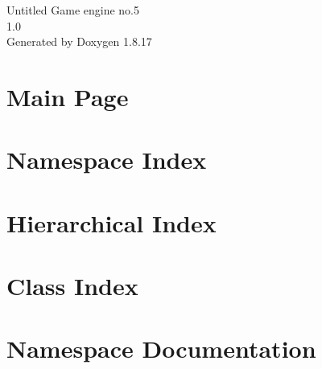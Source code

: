 \let\mypdfximage\pdfximage\def\pdfximage{\immediate\mypdfximage}\documentclass[twoside]{book}
\newcommand{\+}{\discretionary{\mbox{\scriptsize$\hookleftarrow$}}{}{}}
\newcommand{\clearemptydoublepage}{%
  \newpage{\pagestyle{empty}\cleardoublepage}%
}
\begin{document}
\hypersetup{pageanchor=false,
             bookmarksnumbered=true,
             pdfencoding=unicode
            }
\begin{titlepage}
\vspace*{7cm}
\begin{center}%
{\Large Untitled Game engine no.5 \\[1ex]\large 1.\+0 }\\
\vspace*{1cm}
{\large Generated by Doxygen 1.8.17}\\
\end{center}
\end{titlepage}
\clearemptydoublepage
{}
\tableofcontents
\clearemptydoublepage
{}
\hypersetup{pageanchor=true}

\chapter{Main Page}
\label{index}\hypertarget{index}{}
\chapter{Namespace Index}

\chapter{Hierarchical Index}

\chapter{Class Index}

\chapter{Namespace Documentation}


\end{document}
